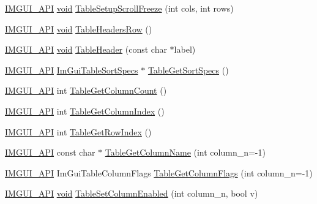 \begin{DoxyCompactItemize}
\hyperlink{imgui_8h_a43829975e84e45d1149597467a14bbf5}{I\+M\+G\+U\+I\+\_\+\+A\+PI} \hyperlink{imgui__impl__opengl3__loader_8h_ac668e7cffd9e2e9cfee428b9b2f34fa7}{void} \hyperlink{namespaceImGui_a3be97defe1cb195b220dccac4e9d3084}{Table\+Setup\+Scroll\+Freeze} (int cols, int rows)
\item 
\hyperlink{imgui_8h_a43829975e84e45d1149597467a14bbf5}{I\+M\+G\+U\+I\+\_\+\+A\+PI} \hyperlink{imgui__impl__opengl3__loader_8h_ac668e7cffd9e2e9cfee428b9b2f34fa7}{void} \hyperlink{namespaceImGui_a0c16791f4620e8db38511553d5d63335}{Table\+Headers\+Row} ()
\item 
\hyperlink{imgui_8h_a43829975e84e45d1149597467a14bbf5}{I\+M\+G\+U\+I\+\_\+\+A\+PI} \hyperlink{imgui__impl__opengl3__loader_8h_ac668e7cffd9e2e9cfee428b9b2f34fa7}{void} \hyperlink{namespaceImGui_ae51bc07bc518779f58def3c0e2d0045c}{Table\+Header} (const char $\ast$label)
\item 
\hyperlink{imgui_8h_a43829975e84e45d1149597467a14bbf5}{I\+M\+G\+U\+I\+\_\+\+A\+PI} \hyperlink{structImGuiTableSortSpecs}{Im\+Gui\+Table\+Sort\+Specs} $\ast$ \hyperlink{namespaceImGui_acaeb2f2896b8332e108b6b1ce1c08fcc}{Table\+Get\+Sort\+Specs} ()
\item 
\hyperlink{imgui_8h_a43829975e84e45d1149597467a14bbf5}{I\+M\+G\+U\+I\+\_\+\+A\+PI} int \hyperlink{namespaceImGui_acaf1dac6c4f24b96ad607958d4298198}{Table\+Get\+Column\+Count} ()
\item 
\hyperlink{imgui_8h_a43829975e84e45d1149597467a14bbf5}{I\+M\+G\+U\+I\+\_\+\+A\+PI} int \hyperlink{namespaceImGui_a0527a5c08501cf1de0eb2c691042e40b}{Table\+Get\+Column\+Index} ()
\item 
\hyperlink{imgui_8h_a43829975e84e45d1149597467a14bbf5}{I\+M\+G\+U\+I\+\_\+\+A\+PI} int \hyperlink{namespaceImGui_a1b93e609ccd69d923f69751c25ac2f5c}{Table\+Get\+Row\+Index} ()
\item 
\hyperlink{imgui_8h_a43829975e84e45d1149597467a14bbf5}{I\+M\+G\+U\+I\+\_\+\+A\+PI} const char $\ast$ \hyperlink{namespaceImGui_a38ddf97e72be7278e6661d7db3055526}{Table\+Get\+Column\+Name} (int column\+\_\+n=-\/1)
\item 
\hyperlink{imgui_8h_a43829975e84e45d1149597467a14bbf5}{I\+M\+G\+U\+I\+\_\+\+A\+PI} Im\+Gui\+Table\+Column\+Flags \hyperlink{namespaceImGui_a809f5ce5ce8ad4035d19cea0e79e1e5f}{Table\+Get\+Column\+Flags} (int column\+\_\+n=-\/1)
\item 
\hyperlink{imgui_8h_a43829975e84e45d1149597467a14bbf5}{I\+M\+G\+U\+I\+\_\+\+A\+PI} \hyperlink{imgui__impl__opengl3__loader_8h_ac668e7cffd9e2e9cfee428b9b2f34fa7}{void} \hyperlink{namespaceImGui_a8e40d2b7a1cdee9d210c7de4cf577f7f}{Table\+Set\+Column\+Enabled} (int column\+\_\+n, bool v)

\end{DoxyCompactItemize}
